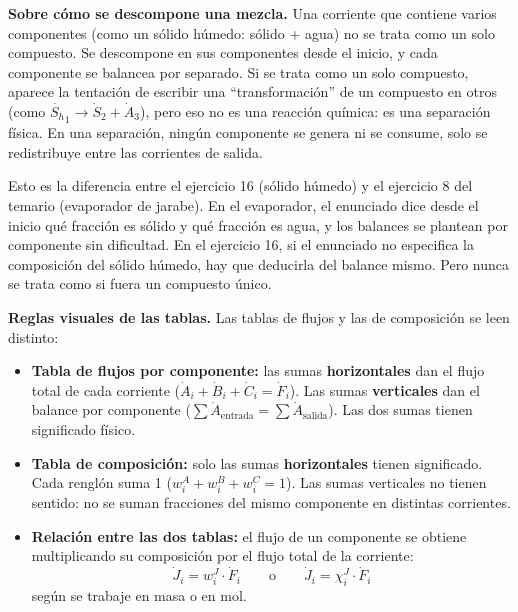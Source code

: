 \begin{notaimportante}
\textbf{Sobre cómo se descompone una mezcla.} Una corriente que
contiene varios componentes (como un sólido húmedo: sólido + agua)
no se trata como un solo compuesto. Se descompone en sus
componentes desde el inicio, y cada componente se balancea por
separado. Si se trata como un solo compuesto, aparece la tentación
de escribir una ``transformación'' de un compuesto en otros
(como $\dot{S_h}_1 \to \dot{S}_2 + \dot{A}_3$), pero eso no es
una reacción química: es una separación física. En una separación,
ningún componente se genera ni se consume, solo se redistribuye
entre las corrientes de salida.

Esto es la diferencia entre el ejercicio 16 (sólido húmedo) y el
ejercicio 8 del temario (evaporador de jarabe). En el evaporador,
el enunciado dice desde el inicio qué fracción es sólido y qué
fracción es agua, y los balances se plantean por componente sin
dificultad. En el ejercicio 16, si el enunciado no especifica la
composición del sólido húmedo, hay que deducirla del balance
mismo. Pero nunca se trata como si fuera un compuesto único.
\end{notaimportante}

\begin{notafija}
\textbf{Reglas visuales de las tablas.} Las tablas de flujos y las de
composición se leen distinto:

\begin{itemize}
    \item \textbf{Tabla de flujos por componente:} las sumas
    \textbf{horizontales} dan el flujo total de cada corriente
    ($\dot{A}_i + \dot{B}_i + \dot{C}_i = \dot{F}_i$). Las sumas
    \textbf{verticales} dan el balance por componente
    ($\sum \dot{A}_{\text{entrada}} = \sum \dot{A}_{\text{salida}}$).
    Las dos sumas tienen significado físico.

    \item \textbf{Tabla de composición:} solo las sumas
    \textbf{horizontales} tienen significado. Cada renglón suma 1
    ($w_i^A + w_i^B + w_i^C = 1$). Las sumas verticales no tienen
    sentido: no se suman fracciones del mismo componente en
    distintas corrientes.

    \item \textbf{Relación entre las dos tablas:} el flujo de un
    componente se obtiene multiplicando su composición por el flujo
    total de la corriente:
    \[
    \dot{J}_i = w_i^J \cdot \dot{F}_i
    \qquad \text{o} \qquad
    \dot{J}_i = \chi_i^J \cdot \dot{F}_i
    \]
    según se trabaje en masa o en mol.
\end{itemize}
\end{notafija}